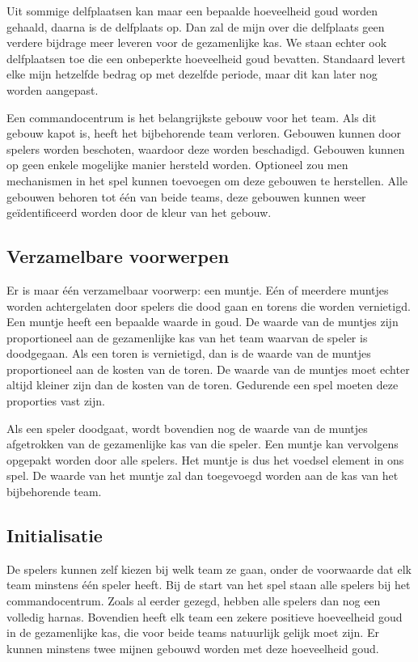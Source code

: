 Uit sommige delfplaatsen kan maar een bepaalde hoeveelheid goud worden gehaald, daarna is de delfplaats op. Dan zal de mijn over die delfplaats geen verdere bijdrage meer leveren voor de gezamenlijke kas. We staan echter ook delfplaatsen toe die een onbeperkte hoeveelheid goud bevatten. Standaard levert elke mijn hetzelfde bedrag op met dezelfde periode, maar dit kan later nog worden aangepast.

Een commandocentrum is het belangrijkste gebouw voor het team. Als dit gebouw kapot is, heeft het bijbehorende team verloren. Gebouwen kunnen door spelers worden beschoten, waardoor deze worden beschadigd. Gebouwen kunnen op geen enkele mogelijke manier hersteld worden. Optioneel zou men mechanismen in het spel kunnen toevoegen om deze gebouwen te herstellen. Alle gebouwen behoren tot \'e\'en van beide teams, deze gebouwen kunnen weer ge\"identificeerd worden door de kleur van het gebouw.

\subsection{Verzamelbare voorwerpen}
Er is maar \'e\'en verzamelbaar voorwerp: een muntje. E\'en of meerdere muntjes worden achtergelaten door spelers die dood gaan en torens die worden vernietigd. Een muntje heeft een bepaalde waarde in goud. De waarde van de muntjes zijn proportioneel aan de gezamenlijke kas van het team waarvan de speler is doodgegaan. Als een toren is vernietigd, dan is de waarde van de muntjes proportioneel aan de kosten van de toren. De waarde van de muntjes moet echter altijd kleiner zijn dan de kosten van de toren. Gedurende een spel moeten deze proporties vast zijn.

Als een speler doodgaat, wordt bovendien nog de waarde van de muntjes afgetrokken van de gezamenlijke kas van die speler. Een muntje kan vervolgens opgepakt worden door alle spelers. Het muntje is dus het voedsel element in ons spel. De waarde van het muntje zal dan toegevoegd worden aan de kas van het bijbehorende team.

\subsection{Initialisatie}
De spelers kunnen zelf kiezen bij welk team ze gaan, onder de voorwaarde dat elk team minstens \'e\'en speler heeft. Bij de start van het spel staan alle spelers bij het commandocentrum. Zoals al eerder gezegd, hebben alle spelers dan nog een volledig harnas. Bovendien heeft elk team een zekere positieve hoeveelheid goud in de gezamenlijke kas, die voor beide teams natuurlijk gelijk moet zijn. Er kunnen minstens twee mijnen gebouwd worden met deze hoeveelheid goud.
\FloatBarrier

